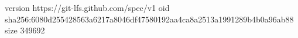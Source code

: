 version https://git-lfs.github.com/spec/v1
oid sha256:6080d255428563a6217a8046df47580192aa4ca8a2513a1991289b4b0a96ab88
size 349692
